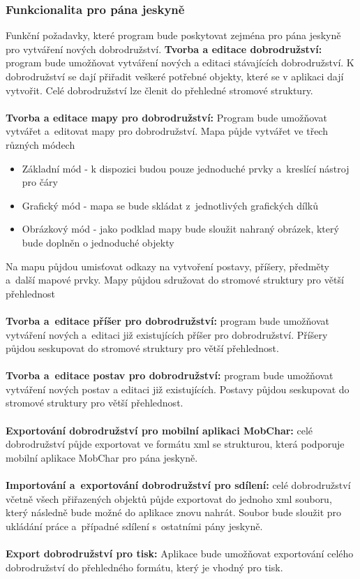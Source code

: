 \documentclass[thesis=B,czech]{resources/FITthesis}[2012/06/26]
\begin{document}
\subsubsection{Funkcionalita pro pána jeskyně}
Funkční požadavky, které program bude poskytovat zejména pro pána jeskyně pro vytváření nových dobrodružství.
\textbf{Tvorba a editace dobrodružství:} program bude umožňovat vytváření nových a editaci stávajících dobrodružství. K dobrodružství se dají přiřadit veškeré potřebné objekty, které se v aplikaci dají vytvořit. Celé dobrodružství lze členit do přehledné stromové struktury.\\
\\
\textbf{Tvorba a editace mapy pro dobrodružství:} Program bude umožňovat vytvářet a~editovat mapy pro dobrodružství. Mapa půjde vytvářet ve třech různých módech
\begin{itemize}
\item Základní mód - k dispozici budou pouze jednoduché prvky a~kreslící nástroj pro čáry
\item Grafický mód - mapa se bude skládat z~jednotlivých grafických dílků
\item Obrázkový mód - jako podklad mapy bude sloužit nahraný obrázek, který bude doplněn o jednoduché objekty
\end{itemize}
Na mapu půjdou umisťovat odkazy na vytvoření postavy, příšery, předměty a~další mapové prvky. Mapy půjdou sdružovat do stromové struktury pro větší přehlednost\\
\\
\textbf{Tvorba a~editace příšer pro dobrodružství:} program bude umožňovat vytváření nových a~editaci již existujících příšer pro dobrodružství. Příšery půjdou seskupovat do stromové struktury pro větší přehlednost.\\
\\
\textbf{Tvorba a~editace postav pro dobrodružství:} program bude umožňovat vytváření nových postav a editaci již existujících. Postavy půjdou seskupovat do stromové struktury pro větší přehlednost.\\
\\
\textbf{Exportování dobrodružství pro mobilní aplikaci MobChar:} celé dobrodružství půjde exportovat ve formátu xml se strukturou, která podporuje mobilní aplikace MobChar pro pána jeskyně.\\
\\
\textbf{Importování a~exportování dobrodružství pro sdílení:} celé dobrodružství včetně všech přiřazených objektů půjde exportovat do jednoho xml souboru, který následně bude možné do aplikace znovu nahrát. Soubor bude sloužit pro ukládání práce a~případné sdílení s~ostatními pány jeskyně.\\
\\
\textbf{Export dobrodružství pro tisk:} Aplikace bude umožňovat exportování celého dobrodružství do přehledného formátu, který je vhodný pro tisk. 
\end{document}
